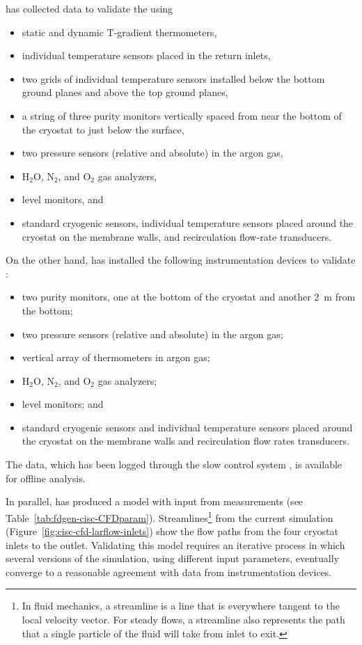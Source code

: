  has collected data to validate the  using %
\begin{itemize}
\item static and dynamic T-gradient thermometers, 
\item individual temperature sensors placed in the return \lar inlets, 
\item two \twod grids of individual temperature sensors installed below the bottom ground planes and above the top ground planes, 
\item a string of three purity monitors vertically spaced from near the bottom of the cryostat to just below the \lar surface,
\item two pressure sensors (relative and absolute) in the argon gas,
\item H$_{2}$O, N$_{2}$, and O$_{2}$ gas analyzers, 
\item {} level monitors, and
\item standard cryogenic sensors, %
individual temperature sensors placed around
the cryostat on the membrane walls, and recirculation flow-rate transducers.
\end{itemize}

On the other hand,  has installed the following instrumentation devices to validate :

\begin{itemize}
\item two purity monitors, one at the bottom of the cryostat and another 2~m from the bottom;
\item two pressure sensors (relative and absolute) in the argon gas;
\item vertical array of thermometers in argon gas;
\item H$_{2}$O, N$_{2}$, and O$_{2}$ gas analyzers; 
\item {} level monitors; and
\item standard cryogenic sensors 
and individual temperature sensors placed around the cryostat on the membrane walls and recirculation flow rates transducers.
\end{itemize}

The data, which has been logged through the  slow control system \cite{pdspdcs_proc}, is available for offline analysis. 


In parallel,  has produced a   model %
with input from  measurements (see Table~\ref{tab:fdgen-cisc-CFDparam}). Streamlines\footnote{In fluid mechanics, a streamline is a line that is everywhere tangent to the local velocity vector. For steady flows, a streamline also represents the path that a single particle of the fluid will take from inlet to exit.} from the current  simulation (Figure~\ref{fig:cisc-cfd-larflow-inlets}) show the flow paths from the four cryostat inlets to the outlet. Validating this model requires an iterative process in which several versions of the  simulation, using different input parameters, eventually %
converge %
to a reasonable agreement with data from instrumentation devices. 




